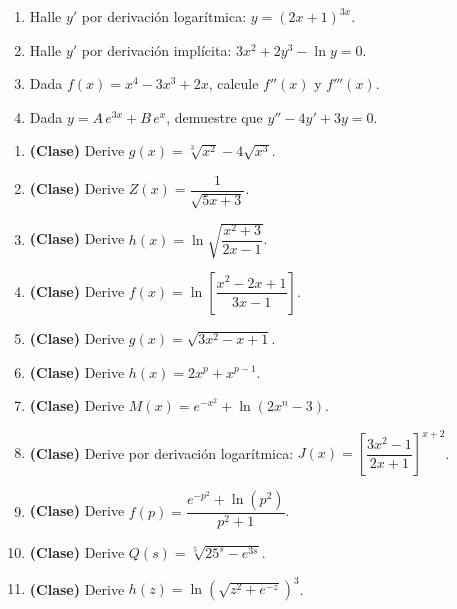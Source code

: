 \documentclass[12pt, letterpaper]{article}
\begin{document}
\begin{enumerate}[leftmargin=*]
  \item \muyDificil{} Halle $y'$ por derivación logarítmica: $y = (2x+1)^{3x}$.

  \item \muyDificil{} Halle $y'$ por derivación implícita: $3x^{2} + 2y^{3} - \ln y = 0$.

  \item \muyDificil{} Dada $f(x) = x^{4} - 3x^{3} + 2x$, calcule $f''(x)$ y $f'''(x)$.

  \item \muyDificil{} Dada $y = A\,e^{3x} + B\,e^{x}$, demuestre que $y'' - 4y' + 3y = 0$.

\end{enumerate}

\begin{enumerate}[leftmargin=*, start=19]

  \item \dificil{} \textbf{(Clase)} Derive $g(x) = \sqrt[3]{x^{2}} - 4\sqrt{x^{3}}$.

  \item \dificil{} \textbf{(Clase)} Derive $Z(x) = \dfrac{1}{\sqrt{5x+3}}$.

  \item \muyDificil{} \textbf{(Clase)} Derive $h(x) = \ln\sqrt{\dfrac{x^{2}+3}{2x-1}}$.

  \item \dificil{} \textbf{(Clase)} Derive $f(x) = \ln\!\left[\dfrac{x^{2}-2x+1}{3x-1}\right]$.

  \item \dificil{} \textbf{(Clase)} Derive $g(x) = \sqrt{3x^{2} - x + 1}$.

  \item \dificil{} \textbf{(Clase)} Derive $h(x) = 2x^{p} + x^{p-1}$.

  \item \dificil{} \textbf{(Clase)} Derive $M(x) = e^{-x^{2}} + \ln(2x^{n} - 3)$.

  \item \muyDificil{} \textbf{(Clase)} Derive por derivación logarítmica: $J(x) = \left[\dfrac{3x^{2}-1}{2x+1}\right]^{x+2}$.

  \item \muyDificil{} \textbf{(Clase)} Derive $f(p) = \dfrac{e^{-p^{2}} + \ln(p^{2})}{p^{2}+1}$.

  \item \muyDificil{} \textbf{(Clase)} Derive $Q(s) = \sqrt[5]{25^{s} - e^{3s}}$.

  \item \muyDificil{} \textbf{(Clase)} Derive $h(z) = \ln\!\left(\sqrt{z^{2} + e^{-z}}\right)^{3}$.


\end{enumerate}
\end{document}
